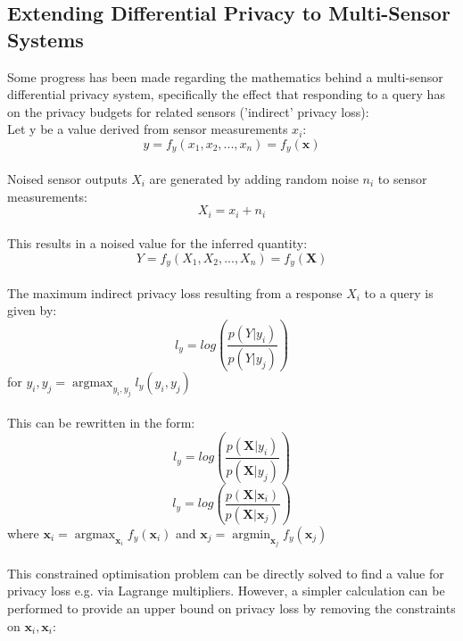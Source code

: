 \documentclass[pageno]{jpaper}
\DeclareMathOperator*{\argmax}{argmax}
\DeclareMathOperator*{\argmin}{argmin}
\begin{document}
\subsection{Extending Differential Privacy to Multi-Sensor Systems} \label{subsection:multi_sensor}
Some progress has been made regarding the mathematics behind a multi-sensor differential privacy system, specifically the effect that responding to a query has on the privacy budgets for related sensors ('indirect' privacy loss):
\\
Let y be a value derived from sensor measurements $x_i$:
\begin{equation} \label{eqn:ub_y}
  y = f_y(x_1, x_2,..., x_n) = f_y(\mathbf{x})
\end{equation}
\\
Noised sensor outputs $X_i$ are generated by adding random noise $n_i$ to sensor measurements:
\begin{equation} \label{eqn:ub_X_i}
  X_i = x_i + n_i
\end{equation}
\\
This results in a noised value for the inferred quantity:
\begin{equation} \label{eqn:ub_Y}
  Y = f_y(X_1, X_2,..., X_n) = f_y(\mathbf{X})
\end{equation}
\\
The maximum indirect privacy loss resulting from a response $X_i$ to a query is given by\cite{Choi2018GuaranteeingLD}:
\begin{equation} \label{eqn:ub_l_y}
  l_y = log\left( \frac{p(Y|y_i)}{p(Y|y_j)} \right)
\end{equation}
for $y_i, y_j = \argmax_{y_i, y_j} l_y(y_i, y_j)$
\\\\
This can be rewritten in the form:
\begin{equation} \label{eqn:ub_l_y_2}
  l_y = log\left( \frac{p(\mathbf{X}|y_i)}{p(\mathbf{X}|y_j)} \right) \nonumber
\end{equation}
\begin{equation} \label{eqn:ub_l_y_constrained}
  l_y = log\left( \frac{p(\mathbf{X}|\mathbf{x}_i)}{p(\mathbf{X}|\mathbf{x}_j)} \right)
\end{equation}
where $\mathbf{x}_i = \argmax_{\mathbf{x}_i} f_y(\mathbf{x}_i)$ and $\mathbf{x}_j = \argmin_{\mathbf{x}_j} f_y(\mathbf{x}_j)$
\\\\
This constrained optimisation problem can be directly solved to find a value for privacy loss e.g. via Lagrange multipliers. However, a simpler calculation can be performed to provide an upper bound on privacy loss by removing the constraints on $\mathbf{x}_i, \mathbf{x}_i$:
\end{document}
